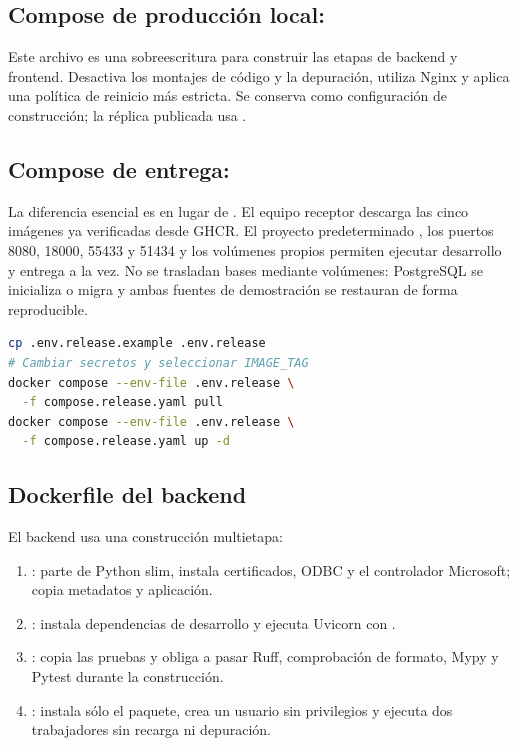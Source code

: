\subsection{Compose de producción local: }

Este archivo es una sobreescritura para construir las etapas  de backend y frontend. Desactiva los montajes de código y la depuración, utiliza Nginx y aplica una política de reinicio más estricta. Se conserva como configuración de construcción; la réplica publicada usa .

\subsection{Compose de entrega: }

La diferencia esencial es  en lugar de . El equipo receptor descarga las cinco imágenes ya verificadas desde GHCR. El proyecto predeterminado , los puertos 8080, 18000, 55433 y 51434 y los volúmenes propios permiten ejecutar desarrollo y entrega a la vez. No se trasladan bases mediante volúmenes: PostgreSQL se inicializa o migra y ambas fuentes de demostración se restauran de forma reproducible.

\begin{lstlisting}[style=terminal,language=bash]
cp .env.release.example .env.release
# Cambiar secretos y seleccionar IMAGE_TAG
docker compose --env-file .env.release \
  -f compose.release.yaml pull
docker compose --env-file .env.release \
  -f compose.release.yaml up -d
\end{lstlisting}

\subsection{Dockerfile del backend}

El backend usa una construcción multietapa:

\begin{enumerate}
  \item {}: parte de Python slim, instala certificados, ODBC y el controlador Microsoft; copia metadatos y aplicación.
  \item {}: instala dependencias de desarrollo y ejecuta Uvicorn con .
  \item \file{test}: copia las pruebas y obliga a pasar Ruff, comprobación de formato, Mypy y Pytest durante la construcción.
  \item \file{production}: instala sólo el paquete, crea un usuario sin privilegios y ejecuta dos trabajadores sin recarga ni depuración.
\end{enumerate}

